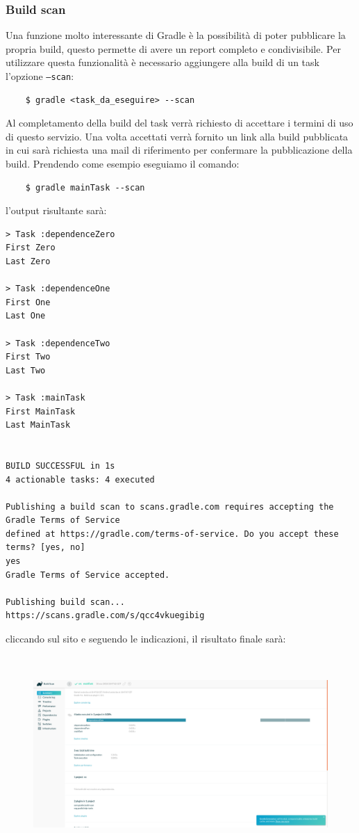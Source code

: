 \subsubsection{Build scan}
Una funzione molto interessante di Gradle è la possibilità di poter pubblicare la propria build, questo permette di avere un report completo e condivisibile. Per utilizzare questa funzionalità è necessario aggiungere alla build di un task l'opzione \texttt{--scan}:
\begin{verbatim}    $ gradle <task_da_eseguire> --scan \end{verbatim}
Al completamento della build del task verrà richiesto di accettare i termini di uso di questo servizio. Una volta accettati verrà fornito un link alla build pubblicata in cui sarà richiesta una mail di riferimento per confermare la pubblicazione della build. Prendendo come esempio eseguiamo il comando:
\begin{verbatim}
    $ gradle mainTask --scan\end{verbatim}
l'output risultante sarà:
\begin{verbatim}
> Task :dependenceZero 
First Zero
Last Zero

> Task :dependenceOne 
First One
Last One

> Task :dependenceTwo 
First Two
Last Two

> Task :mainTask 
First MainTask
Last MainTask


BUILD SUCCESSFUL in 1s
4 actionable tasks: 4 executed

Publishing a build scan to scans.gradle.com requires accepting the Gradle Terms of Service 
defined at https://gradle.com/terms-of-service. Do you accept these terms? [yes, no] 
yes
Gradle Terms of Service accepted.

Publishing build scan...
https://scans.gradle.com/s/qcc4vkuegibig
\end{verbatim}
cliccando sul sito e seguendo le indicazioni, il risultato finale sarà:
\begin{figure}[H]
\centering
\includegraphics[width=1.0\linewidth, height=7.5cm]{1Task/insights/gradleScan.png}
\end{figure}